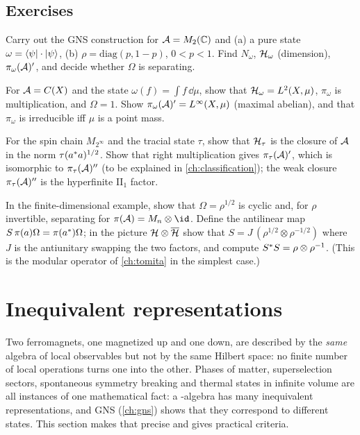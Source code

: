\subsection*{Exercises}
\begin{exercise}\label{ex:gns:1}
Carry out the GNS construction for $\mathcal{A}=M_2(\mathbb{C})$ and (a) a pure state $\omega=\langle \psi\rvert\cdot\lvert \psi\rangle$, (b) $\rho=\mathrm{diag}(p,1-p)$, $0<p<1$. Find $N_\omega$, $\mathcal{H}_\omega$ (dimension), $\pi_\omega(\mathcal{A})'$, and decide whether $\Omega$ is separating.
\end{exercise}
\begin{exercise}\label{ex:gns:2}
For $\mathcal{A}=C(X)$ and the state $\omega(f)=\int f\,\dd\mu$, show that $\mathcal{H}_\omega=L^2(X,\mu)$, $\pi_\omega$ is multiplication, and $\Omega=1$. Show $\pi_\omega(\mathcal{A})'=L^\infty(X,\mu)$ (maximal abelian), and that $\pi_\omega$ is irreducible iff $\mu$ is a point mass.
\end{exercise}
\begin{exercise}\label{ex:gns:3}
For the spin chain $M_{2^\infty}$ and the tracial state $\tau$, show that $\mathcal{H}_\tau$ is the closure of $\mathcal{A}$ in the norm $\tau(a^{*} a)^{1/2}$. Show that right multiplication gives $\pi_\tau(\mathcal{A})'$, which is isomorphic to $\pi_\tau(\mathcal{A})''$ (to be explained in \cref{ch:classification}); the weak closure $\pi_\tau(\mathcal{A})''$ is the hyperfinite II$_1$ factor.
\end{exercise}
\begin{exercise}\label{ex:gns:4}
In the finite-dimensional example, show that $\Omega=\rho^{1/2}$ is cyclic and, for $\rho$ invertible, separating for $\pi(\A)=M_n\otimes\id$. Define the antilinear map $S\,\pi(a)\Omega=\pi(a^{*})\Omega$; in the picture $\mathcal{H}\otimes\overline{\mathcal{H}}$ show that $S=J\,(\rho^{1/2}\otimes\rho^{-1/2})$ where $J$ is the antiunitary swapping the two factors, and compute $S^{*} S=\rho\otimes\rho^{-1}$. (This is the modular operator of \cref{ch:tomita} in the simplest case.)
\end{exercise}

\section{Inequivalent representations}\label{ch:inequiv}

\begin{physmotiv}
Two ferromagnets, one magnetized up and one down, are described by the \emph{same} algebra of local observables but not by the same Hilbert space: no finite number of local operations turns one into the other. Phases of matter, superselection sectors, spontaneous symmetry breaking and thermal states in infinite volume are all instances of one mathematical fact: a \cstar-algebra has many inequivalent representations, and GNS (\cref{ch:gns}) shows that they correspond to different states. This section makes that precise and gives practical criteria.
\end{physmotiv}

